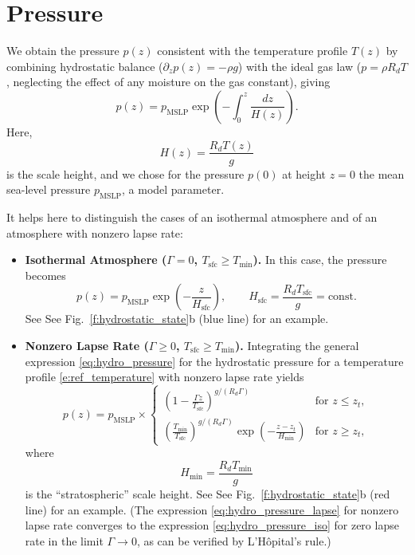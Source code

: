 \documentclass{report}
\begin{document}
\section{Pressure}

We obtain the pressure $p(z)$ consistent with the temperature profile $T(z)$ by combining hydrostatic balance ($\partial_z p(z) = - \rho g$) with the ideal gas law ($p=\rho R_d T$, neglecting the effect of any moisture on the gas constant), giving
\begin{equation}\label{eq:hydro_pressure}
p(z) = p_{\mathrm{MSLP}} \exp\left(-\int_0^z \frac{dz}{H(z)} \right).
\end{equation}
Here,
\begin{equation}
H(z)  = \frac{R_d T(z)}{g}
\end{equation}
is the scale height, and we chose for the pressure $p(0)$ at height $z=0$ the mean sea-level pressure $p_{\mathrm{MSLP}}$, a model parameter. 

It helps here to distinguish the cases of an isothermal atmosphere and of an atmosphere with nonzero lapse rate:
\begin{itemize}
\item \textbf{Isothermal Atmosphere ($\Gamma = 0$, $T_{\mathrm{sfc}} \ge T_{\min}$).} 
In this case, the pressure becomes 
\begin{equation}\label{eq:hydro_pressure_iso}
    p(z) = p_{\mathrm{MSLP}} \exp \left(-\frac{z}{H_{\mathrm{sfc}}} \right), \qquad H_{\mathrm{sfc}} = \frac{R_d T_{\mathrm{sfc}}}{g} = \mathrm{const}.
\end{equation}
See See Fig.~\ref{f:hydrostatic_state}b (blue line) for an example.

\item \textbf{Nonzero Lapse Rate ($\Gamma \ge 0$, $T_{\mathrm{sfc}} \ge T_{\min}$).}
Integrating the general expression \eqref{eq:hydro_pressure} for the hydrostatic pressure for a temperature profile \eqref{e:ref_temperature} with nonzero lapse rate yields
\begin{equation}\label{eq:hydro_pressure_lapse}
p(z) = p_{\mathrm{MSLP}} \times
\begin{cases}
\left(1 - \frac{\Gamma z}{T_{\mathrm{sfc}}} \right)^{g/(R_d \Gamma)} & \text{for } z \le z_t, \\[1.5ex]
  \left(\frac{T_{\min}}{T_{\mathrm{sfc}}} \right)^{g/(R_d \Gamma)}
 \exp  \left(-\frac{z - z_t}{H_{\min}} \right) & \text{for } z\ge z_t, 
\end{cases}
\end{equation}
where 
\begin{equation}
H_{\min} = \frac{R_d T_{\min}}{g}
\end{equation}
is the ``stratospheric'' scale height. See See Fig.~\ref{f:hydrostatic_state}b (red line) for an example. (The expression \eqref{eq:hydro_pressure_lapse} for nonzero lapse rate converges to the expression \eqref{eq:hydro_pressure_iso} for zero lapse rate in the limit $\Gamma \to 0$, as can be verified by L'H{\^o}pital's rule.)
\end{itemize}
\end{document}
